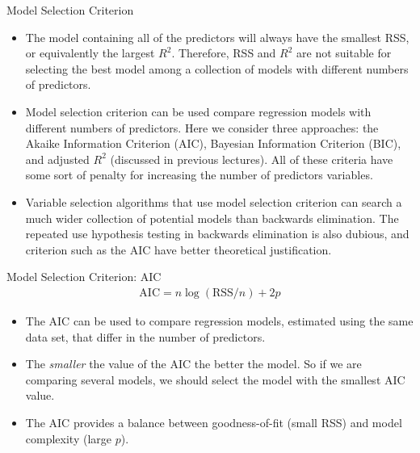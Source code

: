 \documentclass[10pt]{beamer}\usepackage[]{graphicx}\usepackage[]{color}
\newcommand{\AIC}{\text{AIC}}
\newcommand{\RSS}{\text{RSS}}
\begin{document}
\begin{frame}{Model Selection Criterion}
\begin{itemize}
\item The model containing all of the predictors will always have the smallest RSS, or equivalently the largest $R^2$.  Therefore, RSS and $R^2$ are not suitable for selecting the best model among a collection of models with different numbers of predictors.
\vspace{5pt}
\item Model selection criterion can be used compare regression models with different numbers of predictors.  Here we consider three approaches: the Akaike Information Criterion (AIC),  Bayesian Information Criterion (BIC), and adjusted $R^2$ (discussed in previous lectures).  All of these criteria have some sort of penalty for increasing the number of predictors variables.
\vspace{5pt}
\item Variable selection algorithms that use model selection criterion can search a much wider collection of potential models than backwards elimination.  The repeated use hypothesis testing in backwards elimination is also dubious, and criterion such as the AIC have better theoretical justification.
\end{itemize}
\end{frame}

\begin{frame}{Model Selection Criterion: AIC}
\begin{align*}
\AIC =  n \log(\RSS / n) + 2p
\end{align*}
\begin{itemize}
\item The AIC can be used to compare regression models, estimated using the same data set, that differ in the number of predictors.
\vspace{5pt}
\item The \emph{smaller} the value of the AIC the better the model.  So if we are comparing several models, we should select the model with the smallest AIC value. 
\vspace{5pt}
\item The AIC provides a balance between goodness-of-fit (small RSS) and model complexity (large $p$).
\end{itemize}
\end{frame}
\end{document}
